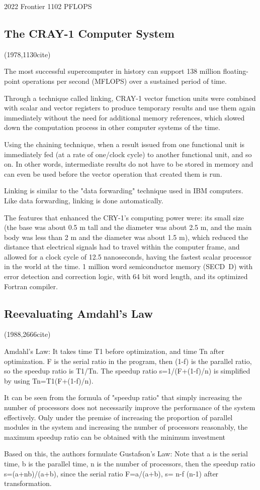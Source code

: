 \documentclass[a4paper,twoside]{scrbook}
\begin{document}
2022 Frontier 1102 PFLOPS

\subsection{The CRAY-1 Computer System\cite{russell1978cray}}
(1978,1130cite)\par
The most successful supercomputer in history can support 138 million floating-point operations per second (MFLOPS) over a sustained period of time.

Through a technique called linking, CRAY-1 vector function units were combined with scalar and vector registers to produce temporary results and use them again immediately without the need for additional memory references, which slowed down the computation process in other computer systems of the time.

Using the chaining technique, when a result issued from one functional unit is immediately fed (at a rate of one/clock cycle) to another functional unit, and so on. In other words, intermediate results do not have to be stored in memory and can even be used before the vector operation that created them is run.

Linking is similar to the "data forwarding" technique used in IBM computers. Like data forwarding, linking is done automatically.

The features that enhanced the CRY-1's computing power were: its small size (the base was about 0.5 m tall and the diameter was about 2.5 m, and the main body was less than 2 m and the diameter was about 1.5 m), which reduced the distance that electrical signals had to travel within the computer frame, and allowed for a clock cycle of 12.5 nanoseconds, having the fastest scalar processor in the world at the time. 1 million word semiconductor memory (SECD~D) with error detection and correction logic, with 64 bit word length, and its optimized Fortran compiler.
\subsection{Reevaluating Amdahl's Law\cite{gustafson1988reevaluating}}
(1988,2666cite)\par
Amdahl's Law:
It takes time T1 before optimization, and time Tn after optimization. F is the serial ratio in the program, then (1-f) is the parallel ratio, so the speedup ratio is T1/Tn. The speedup ratio s=1/(F+(1-f)/n) is simplified by using Tn=T1(F+(1-f)/n).

It can be seen from the formula of "speedup ratio" that simply increasing the number of processors does not necessarily improve the performance of the system effectively. Only under the premise of increasing the proportion of parallel modules in the system and increasing the number of processors reasonably, the maximum speedup ratio can be obtained with the minimum investment
\par
Based on this, the authors formulate Gustafson's Law:
Note that a is the serial time, b is the parallel time, n is the number of processors, then the speedup ratio s=(a+nb)/(a+b), since the serial ratio F=a/(a+b), s= n-f (n-1) after transformation.
\end{document}
